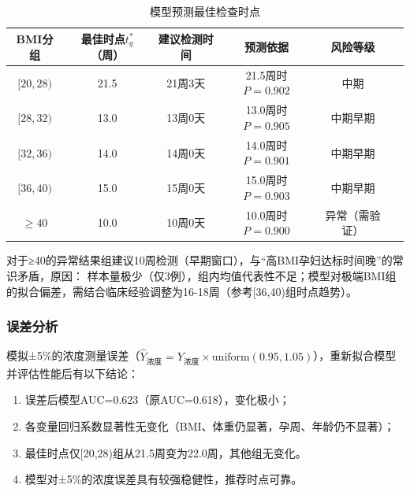 \documentclass[withoutpreface,bwprint]{cumcmthesis} %
\begin{document}
\begin{table}[H]
    \centering  %
    \caption{模型预测最佳检查时点}  %
    \label{tab:模型预测最佳检查时点}  %
    \begin{threeparttable}
        \begin{tabularx}{\textwidth}{c c c c c c}
            \toprule[1.5pt]
            \textbf{BMI分组} & \textbf{最佳时点$t_g^*$（周）} & \textbf{建议检测时间} & \textbf{预测依据}& \textbf{风险等级}\\ 
            \midrule[1pt]
            $[20,28)$ & 21.5 & 21周3天 & 21.5周时$P=0.902$ & 中期     \\  
            $[28,32)$ & 13.0 & 13周0天 & 13.0周时$P=0.905$ & 中期早期   \\
            $[32,36)$ & 14.0 & 14周0天 & 14.0周时$P=0.901$ & 中期早期   \\
            $[36,40)$ & 15.0 & 15周0天 & 15.0周时$P=0.903$ & 中期早期   \\
            $≥40    $ & 10.0 & 10周0天 & 10.0周时$P=0.900$ & 异常（需验证）\\ 
            \bottomrule[1.5pt]
        \end{tabularx}
    \end{threeparttable}
\end{table}

对于≥40的异常结果组建议10周检测（早期窗口），与“高BMI孕妇达标时间晚”的常识矛盾，原因：  
样本量极少（仅3例），组内均值代表性不足；模型对极端BMI组的拟合偏差，需结合临床经验调整为16-18周（参考[36,40)组时点趋势）。  

\subsubsection{误差分析}

模拟±5\%的浓度测量误差（$\hat{Y}_{\text{浓度}}=Y_{\text{浓度}} \times \text{uniform}(0.95,1.05)$），重新拟合模型并评估性能后有以下结论：
\begin{enumerate}
    \item 误差后模型AUC=0.623（原AUC=0.618），变化极小；  
    \item 各变量回归系数显著性无变化（BMI、体重仍显著，孕周、年龄仍不显著）；  
    \item 最佳时点仅[20,28)组从21.5周变为22.0周，其他组无变化。 
    \item 模型对±5\%的浓度误差具有较强稳健性，推荐时点可靠。
\end{enumerate} 
\end{document}
